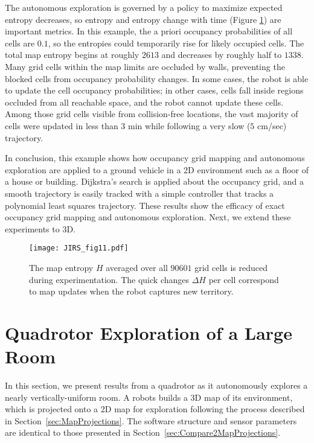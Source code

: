 The autonomous exploration is governed by a policy to maximize expected entropy decreases, so entropy and entropy change with time (Figure \ref{fig:ExperimentH}) are important metrics. In this example, the a priori occupancy probabilities of all cells are $0.1$, so the entropies could temporarily rise for likely occupied cells. The total map entropy begins at roughly $2613$ and decreases by roughly half to $1338$. Many grid cells within the map limits are occluded by walls, preventing the blocked cells from occupancy probability changes. In some cases, the robot is able to update the cell occupancy probabilities; in other cases, cells fall inside regions occluded from all reachable space, and the robot cannot update these cells. Among those grid cells visible from collision-free locations, the vast majority of cells were updated in less than $3$ min while following a very slow ($5$ cm/sec) trajectory.

In conclusion, this example shows how occupancy grid mapping and autonomous exploration are applied to a ground vehicle in a 2D environment such as a floor of a house or building. Dijkstra's search is applied about the occupancy grid, and a smooth trajectory is easily tracked with a simple controller that tracks a polynomial least squares trajectory. These results show the efficacy of exact occupancy grid mapping and autonomous exploration. Next, we extend these experiments to 3D.

\begin{figure}
	\centering
	\texttt{[image: JIRS\_fig11.pdf]}
	\caption{The map entropy $H$ averaged over all $90601$ grid cells is reduced during experimentation. The quick changes $\Delta H$ per cell correspond to map updates when the robot captures new territory.}
\label{fig:ExperimentH}
\end{figure}




\section{Quadrotor Exploration of a Large Room}
\label{sec:QuadrotorNRL}


In this section, we present results from a quadrotor as it autonomously explores a nearly vertically-uniform room. A robots builds a 3D map of its environment, which is projected onto a 2D map for exploration following the process described in Section~\ref{sec:MapProjections}. The software structure and sensor parameters are identical to those presented in Section~\ref{sec:Compare2MapProjections}.

